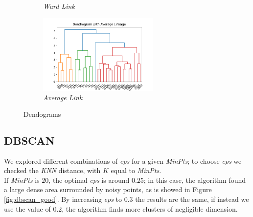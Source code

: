 \begin{figure}[h!]
\begin{subfigure}{0.49\textwidth}
        \caption{\emph{Ward Link}}
        \label{fig:ward_link}
    \end{subfigure}
    \begin{subfigure}{0.49\textwidth}
         \centering
         \includegraphics[width=0.65\textwidth]{img/clustering/avg_link.png}
         \caption{\emph{Average Link}}
         \label{fig:avg_link}
     \end{subfigure}
     \caption{Dendograms}
    \label{fig:dendograms}
\end{figure}

\newpage

\subsection{DBSCAN}

We explored different combinations of \emph{eps} for a given \emph{MinPts}; to choose \emph{eps} we checked the \emph{KNN} distance, with $K$ equal to \emph{MinPts}.\\
If \emph{MinPts} is $20$, the optimal \emph{eps} is around $0.25$; in this case, the algorithm found a large dense area surrounded by noisy points, as is showed in Figure \ref{fig:dbscan_good}. By increasing \emph{eps} to $0.3$ the results are the same, if instead we use the value of $0.2$, the algorithm finds more clusters of negligible dimension.

